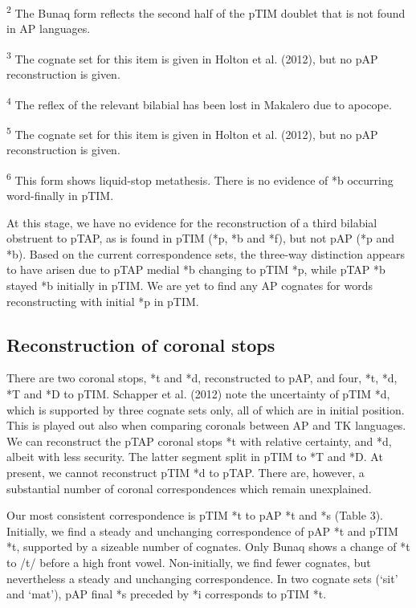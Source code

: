 \textsuperscript{2 }The Bunaq form reflects the second half of the pTIM doublet that is not found in AP languages.

\textsuperscript{3} The cognate set for this item is given in Holton et al. (2012), but no pAP reconstruction is given.

\textsuperscript{4 }The reflex of the relevant bilabial has been lost in Makalero due to apocope.

\textsuperscript{5} The cognate set for this item is given in Holton et al. (2012), but no pAP reconstruction is given.

\textsuperscript{6} This form shows liquid-stop metathesis. There is no evidence of *b occurring word-finally in pTIM.

At this stage, we have no evidence for the reconstruction of a third bilabial obstruent to pTAP, as is found in pTIM (*p, *b and *f), but not pAP (*p and *b). Based on the current correspondence sets, the three-way distinction appears to have arisen due to pTAP medial *b changing to pTIM *p, while pTAP *b stayed *b initially in pTIM. We are yet to find any AP cognates for words reconstructing with initial *p in pTIM.

\subsection[Reconstruction of coronal stops]{\textbf{Reconstruction of coronal stops}}
\hypertarget{RefHeading65409871885726}{}There are two coronal stops, *t and *d, reconstructed to pAP, and four, *t, *d, *T and *D to pTIM. Schapper et al. (2012) note the uncertainty of pTIM *d, which is supported by three cognate sets only, all of which are in initial position. This is played out also when comparing coronals between AP and TK languages. We can reconstruct the pTAP coronal stops *t with relative certainty, and *d, albeit with less security. The latter segment split in pTIM to *T and *D. At present, we cannot reconstruct pTIM *d to pTAP. There are, however, a substantial number of coronal correspondences which remain unexplained. 

Our most consistent correspondence is pTIM *t to pAP *t and *s (Table 3). Initially, we find a steady and unchanging correspondence of pAP *t and pTIM *t, supported by a sizeable number of cognates. Only Bunaq shows a change of *t to /t{\textesh}/ before a high front vowel. Non-initially, we find fewer cognates, but nevertheless a steady and unchanging correspondence. In two cognate sets ({\textquoteleft}sit{\textquoteright} and {\textquoteleft}mat{\textquoteright}), pAP final *s preceded by *i corresponds to pTIM *t.

